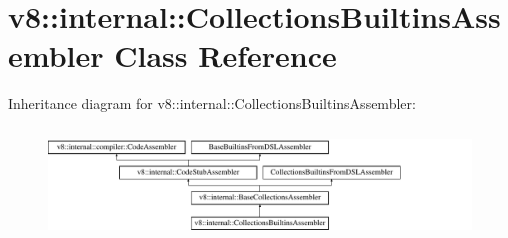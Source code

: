 \hypertarget{classv8_1_1internal_1_1CollectionsBuiltinsAssembler}{}\section{v8\+:\+:internal\+:\+:Collections\+Builtins\+Assembler Class Reference}
\label{classv8_1_1internal_1_1CollectionsBuiltinsAssembler}
Inheritance diagram for v8\+:\+:internal\+:\+:Collections\+Builtins\+Assembler\+:\begin{figure}[H]
\begin{center}
\leavevmode
\includegraphics[height=2.998662cm]{classv8_1_1internal_1_1CollectionsBuiltinsAssembler}
\end{center}
\end{figure}
